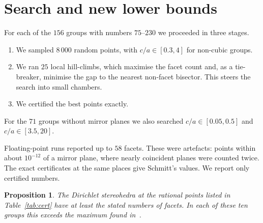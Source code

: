 \documentclass[11pt]{amsart}
\newtheorem{proposition}[theorem]{Proposition}
\theoremstyle{definition}
\begin{document}
\section{Search and new lower bounds}
For each of the $156$ groups with numbers $75$--$230$ we proceeded in three stages.
\begin{enumerate}[leftmargin=1.5em]
\item We sampled $8\,000$ random points, with $c/a\in[0.3,4]$ for non-cubic groups.
\item We ran $25$ local hill-climbs, which maximise the facet count and, as a tie-breaker, minimise the gap to the
nearest non-facet bisector. This steers the search into small chambers.
\item We certified the best points exactly.
\end{enumerate}
For the $71$ groups without mirror planes we also searched $c/a\in[0.05,0.5]$ and $c/a\in[3.5,20]$.

Floating-point runs reported up to $58$ facets. These were artefacts: points within about $10^{-12}$ of a mirror plane,
where nearly coincident planes were counted twice. The exact certificates at the same places give Schmitt's values. We
report only certified numbers.

\begin{proposition}
The Dirichlet stereohedra at the rational points listed in Table~\ref{tab:cert} have at least the stated numbers of
facets. In each of these ten groups this exceeds the maximum found in~\cite{Sch16}.
\end{proposition}
\end{document}
